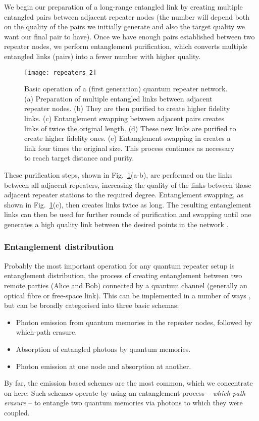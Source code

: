 We begin our preparation of a long-range entangled link by creating multiple entangled pairs between adjacent repeater nodes (the number will depend both on the quality of the pairs we initially generate and also the target quality we want our final pair to have). Once we have enough pairs established between two repeater nodes, we perform entanglement purification, which converts multiple entangled links (pairs) into a fewer number with higher quality. 
\begin{figure}[!htb]
\texttt{[image: repeaters\_2]}
\caption{Basic operation of a (first generation) quantum repeater network. (a) Preparation of multiple entangled links between adjacent repeater nodes. (b) They are then purified to create higher fidelity links. (c) Entanglement swapping between adjacent pairs creates links of twice the original length. (d) These new links are purified to create higher fidelity ones. (e) Entanglement swapping in creates a link four times the original size. This process continues as necessary to reach target distance and purity.} 
\label{fig:repeaters_2}
\end{figure} 
These purification steps, shown in Fig.~\ref{fig:repeaters_2}(a-b), are performed on the links between all adjacent repeaters, increasing the quality of the links between those adjacent repeater stations to the required degree. Entanglement swapping, as shown in Fig.~\ref{fig:repeaters_2}(c), then creates links twice as long. The resulting entanglement links can then be used for further rounds of purification and swapping until one generates a high quality link between the desired points in the network \cite{}. 

\subsubsection{Entanglement distribution}\label{sec:reps_ent_dist}

Probably the most important operation for any quantum repeater setup is entanglement distribution, the process of creating entanglement between two remote parties (Alice and Bob) connected by a quantum channel (generally an optical fibre or free-space link). This can be implemented in a number of ways \cite{bib:Bennett96, bib:nk98, bib:bennett93, bib:SSRG09, bib:childress06, bib:loock06, bib:munro08}, but can be broadly categorised into three basic schemas:
\begin{itemize}
\item Photon emission from quantum memories in the repeater nodes, followed by which-path erasure.
\item Absorption of entangled photons by quantum memories.
\item Photon emission at one node and absorption at another.
\end{itemize}
By far, the emission based schemes are the most common, which we concentrate on here. Such schemes operate by using an entanglement process -- \textit{which-path erasure} -- to entangle two quantum memories via photons to which they were coupled.

